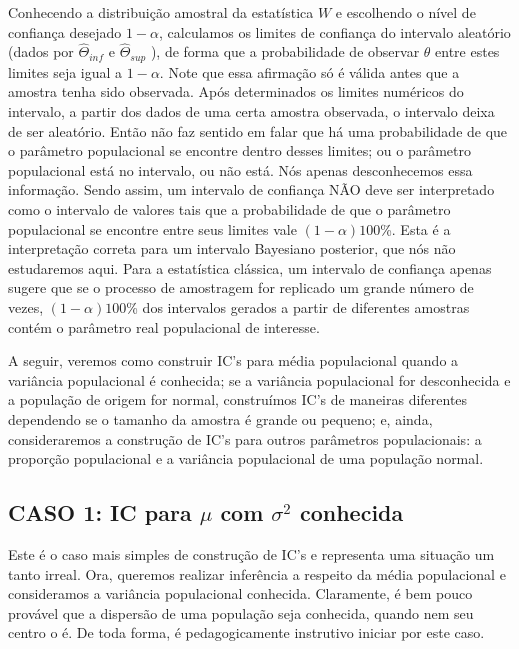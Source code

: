 \documentclass[
]{book}
\theoremstyle{definition}
\theoremstyle{definition}
\theoremstyle{definition}
\theoremstyle{remark}
\begin{document}
Conhecendo a distribuição amostral da estatística \(W\) e escolhendo o nível de confiança desejado \(1-\alpha\), calculamos os limites de confiança do intervalo aleatório (dados por \(\hat\Theta_{inf}\) e \(\hat\Theta_{sup}\) ), de forma que a probabilidade de observar \(\theta\) entre estes limites seja igual a \(1-\alpha\). Note que essa afirmação só é válida antes que a amostra tenha sido observada. Após determinados os limites numéricos do intervalo, a partir dos dados de uma certa amostra observada, o intervalo deixa de ser aleatório. Então não faz sentido em falar que há uma probabilidade de que o parâmetro populacional se encontre dentro desses limites; ou o parâmetro populacional está no intervalo, ou não está. Nós apenas desconhecemos essa informação. Sendo assim, um intervalo de confiança NÃO deve ser interpretado como o intervalo de valores tais que a probabilidade de que o parâmetro populacional se encontre entre seus limites vale \((1-\alpha) 100\)\%. Esta é a interpretação correta para um intervalo Bayesiano posterior, que nós não estudaremos aqui. Para a estatística clássica, um intervalo de confiança apenas sugere que se o processo de amostragem for replicado um grande número de vezes, \((1-\alpha)100\)\% dos intervalos gerados a partir de diferentes amostras contém o parâmetro real populacional de interesse.

A seguir, veremos como construir IC's para média populacional quando a variância populacional é conhecida; se a variância populacional for desconhecida e a população de origem for normal, construímos IC's de maneiras diferentes dependendo se o tamanho da amostra é grande ou pequeno; e, ainda, consideraremos a construção de IC's para outros parâmetros populacionais: a proporção populacional e a variância populacional de uma população normal.

\hypertarget{caso-1-ic-para-mu-com-sigma2-conhecida}{%
\subsection*{\texorpdfstring{CASO 1: IC para \(\mu\) com \(\sigma^2\) conhecida}{CASO 1: IC para \textbackslash mu com \textbackslash sigma\^{}2 conhecida}}\label{caso-1-ic-para-mu-com-sigma2-conhecida}}

Este é o caso mais simples de construção de IC's e representa uma situação um tanto irreal. Ora, queremos realizar inferência a respeito da média populacional e consideramos a variância populacional conhecida. Claramente, é bem pouco provável que a dispersão de uma população seja conhecida, quando nem seu centro o é. De toda forma, é pedagogicamente instrutivo iniciar por este caso.
\end{document}
